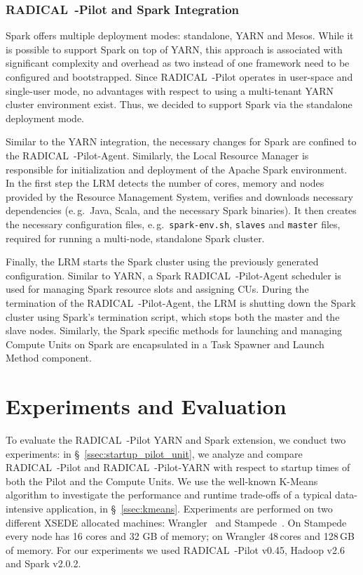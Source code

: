 \subsubsection{RADICAL~-Pilot and Spark Integration}
\label{sssec:rp_spark}
Spark offers multiple deployment modes: standalone, YARN and Mesos.
While it is possible to support Spark on top of YARN, this approach is associated with significant complexity and overhead as two instead of one framework need to be configured and bootstrapped.
Since RADICAL~-Pilot operates in user-space and single-user mode, no advantages with respect to using a multi-tenant YARN cluster environment exist.
Thus, we decided to support Spark via the standalone deployment mode.

Similar to the YARN integration, the necessary changes for Spark are confined to the RADICAL~-Pilot-Agent.
Similarly, the Local Resource Manager is responsible for initialization and deployment of the Apache Spark environment.
In the first step the LRM detects the number of cores, memory and nodes provided by the Resource Management System, verifies and downloads necessary dependencies (e.\,g.\ Java, Scala, and the necessary Spark binaries).
It then creates the necessary configuration files, e.\,g.\ \texttt{spark-env.sh}, \texttt{slaves} and \texttt{master} files, required for running a multi-node, standalone Spark cluster.

Finally, the LRM starts the Spark cluster using the previously generated configuration.
Similar to YARN, a Spark RADICAL~-Pilot-Agent scheduler is used for managing Spark resource slots and assigning CUs.
During the termination of the RADICAL~-Pilot-Agent, the LRM is shutting down the Spark cluster using Spark’s termination script, which stops both the master and the slave nodes.
Similarly, the Spark specific methods for launching and managing Compute Units on Spark are encapsulated in a Task Spawner and Launch Method component.

\section{Experiments and Evaluation}
\label{sec:rph-exps}

To evaluate the RADICAL~-Pilot YARN and Spark extension, we conduct two experiments: in \S~\ref{ssec:startup_pilot_unit}, we analyze and compare RADICAL~-Pilot and RADICAL~-Pilot-YARN with respect to startup times of both the Pilot and the Compute Units.
We use the well-known K-Means algorithm to investigate the performance and runtime trade-offs of a typical data-intensive application, in \S~\ref{ssec:kmeans}.
Experiments are performed on two different XSEDE allocated machines: Wrangler~\cite{wrangler} and Stampede~\cite{stampede}.
On Stampede every node has 16 cores and 32 GB of memory; on Wrangler 48\,cores and 128\,GB of memory.
For our experiments we used RADICAL~-Pilot v0.45, Hadoop v2.6 and Spark v2.0.2.

